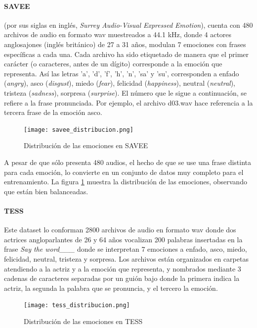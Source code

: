\documentclass[11pt,a4paper,spanish]{book}
\begin{document}
	\paragraph{SAVEE} (por sus siglas en inglés, \emph{ Surrey Audio-Visual Expressed Emotion}), cuenta con 480 archivos de audio en formato wav muestreados a 44.1 kHz, donde 4 actores anglosajones (inglés británico) de 27 a 31 años, modulan 7 emociones con frases específicas a cada una.
	Cada archivo ha sido etiquetado de manera que el primer carácter (o caracteres, antes de un dígito) corresponde a la emoción que representa. Así las letras 'a', 'd', 'f', 'h', 'n', 'sa' y 'su', corresponden a enfado (\emph{angry}), asco (\emph{disgust}), miedo (\emph{fear}), felicidad (\emph{happiness}), neutral (\emph{neutral}), tristeza (\emph{sadness}), sorpresa (\emph{surprise}). El número que le sigue a continuación, se refiere a la frase pronunciada. Por ejemplo, el archivo d03.wav hace referencia a la tercera frase de la emoción asco.
	
	\begin{figure}[H]
		\centering
		\texttt{[image: savee\_distribucion.png]} 
		\caption{Distribución de las emociones en SAVEE}
		\label{fig:emociones_savee}
	\end{figure}
	
	A pesar de que sólo presenta 480 audios, el hecho de que se use una frase distinta para cada emoción, lo convierte en un conjunto de datos muy completo para el entrenamiento. La figura \ref{fig:emociones_savee} muestra la distribución de las emociones, observando que están bien balanceadas.

	\paragraph{TESS}
	Este dataset lo conforman 2800 archivos de audio en formato wav donde dos actrices angloparlantes de 26 y 64 años vocalizan 200 palabras insertadas en la frase \emph{Say the word\_\_\_} donde se interpretan 7 emociones a enfado, asco, miedo, felicidad, neutral, tristeza y sorpresa. Los archivos están organizados en carpetas atendiendo a la actriz y a la emoción que representa, y nombrados mediante 3 cadenas de caracteres separadas por un guión bajo donde la primera indica la actriz, la segunda la palabra que se pronuncia, y el tercero la emoción.
	
	\begin{figure}[H]
		\centering
		\texttt{[image: tess\_distribucion.png]} 
		\caption{Distribución de las emociones en TESS}
		\label{fig:emociones_tess}
	\end{figure}
\end{document}
